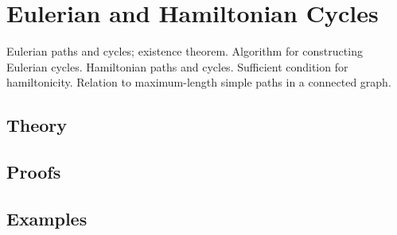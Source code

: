 
\section{Eulerian and Hamiltonian Cycles}
\label{sec:2.2.09-eulerian-hamiltonian}

\begin{ticket}
Eulerian paths and cycles; existence theorem. Algorithm for constructing Eulerian cycles. Hamiltonian paths and cycles. Sufficient condition for hamiltonicity. Relation to maximum-length simple paths in a connected graph.
\end{ticket}

\subsection*{Theory}

\subsection*{Proofs}

\subsection*{Examples}
